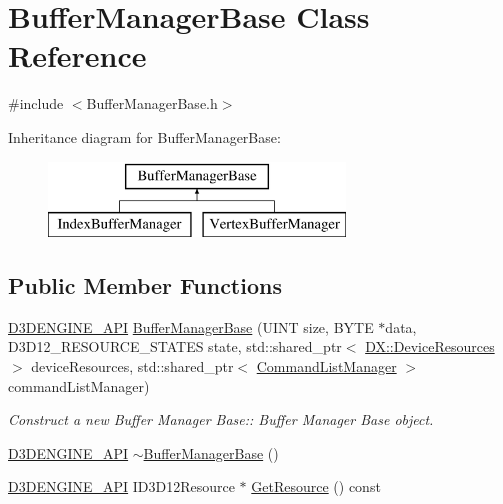 \hypertarget{class_buffer_manager_base}{}\section{Buffer\+Manager\+Base Class Reference}
\label{class_buffer_manager_base}


{\ttfamily \#include $<$Buffer\+Manager\+Base.\+h$>$}

Inheritance diagram for Buffer\+Manager\+Base\+:\begin{figure}[H]
\begin{center}
\leavevmode
\includegraphics[height=2.000000cm]{d2/d01/class_buffer_manager_base}
\end{center}
\end{figure}
\subsection*{Public Member Functions}
\begin{DoxyCompactItemize}
\item 
\mbox{\hyperlink{stdafx_8h_a8ee2d990c5dfba7794dd2b60741d7722}{D3\+D\+E\+N\+G\+I\+N\+E\+\_\+\+A\+PI}} \mbox{\hyperlink{class_buffer_manager_base_a9cec2f80ae72dc972ef6d18ab075ab6c}{Buffer\+Manager\+Base}} (U\+I\+NT size, B\+Y\+TE $\ast$data, D3\+D12\+\_\+\+R\+E\+S\+O\+U\+R\+C\+E\+\_\+\+S\+T\+A\+T\+ES state, std\+::shared\+\_\+ptr$<$ \mbox{\hyperlink{class_d_x_1_1_device_resources}{D\+X\+::\+Device\+Resources}} $>$ device\+Resources, std\+::shared\+\_\+ptr$<$ \mbox{\hyperlink{class_command_list_manager}{Command\+List\+Manager}} $>$ command\+List\+Manager)
\begin{DoxyCompactList}\small\item\em Construct a new Buffer Manager Base\+:\+: Buffer Manager Base object. \end{DoxyCompactList}\item 
\mbox{\hyperlink{stdafx_8h_a8ee2d990c5dfba7794dd2b60741d7722}{D3\+D\+E\+N\+G\+I\+N\+E\+\_\+\+A\+PI}} \mbox{\hyperlink{class_buffer_manager_base_af579a9443cc34b2526a38b87b437c895}{$\sim$\+Buffer\+Manager\+Base}} ()
\item 
\mbox{\hyperlink{stdafx_8h_a8ee2d990c5dfba7794dd2b60741d7722}{D3\+D\+E\+N\+G\+I\+N\+E\+\_\+\+A\+PI}} I\+D3\+D12\+Resource $\ast$ \mbox{\hyperlink{class_buffer_manager_base_afa03f652ef76e70618f7f112b7da48c5}{Get\+Resource}} () const
\end{DoxyCompactItemize}
